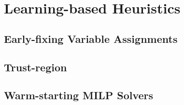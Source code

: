 \section{Learning-based Heuristics}\label{sec:learning-based-heuristics}

\subsection{Early-fixing Variable Assignments}

\subsection{Trust-region}

\subsection{Warm-starting MILP Solvers}

